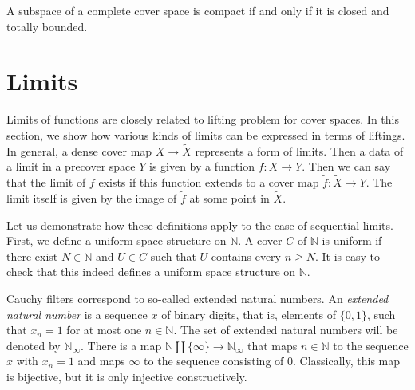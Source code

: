 \documentclass[reqno]{amsart}
\theoremstyle{definition}
\theoremstyle{remark}
\numberwithin{figure}{section}
\begin{document}
\begin{cor}
A subspace of a complete cover space is compact if and only if it is closed and totally bounded.
\end{cor}

\section{Limits}
\label{sec:limits}

Limits of functions are closely related to lifting problem for cover spaces.
In this section, we show how various kinds of limits can be expressed in terms of liftings.
In general, a dense cover map $X \to \widetilde{X}$ represents a form of limits.
Then a data of a limit in a precover space $Y$ is given by a function $f : X \to Y$.
Then we can say that the limit of $f$ exists if this function extends to a cover map $\widetilde{f} : \widetilde{X} \to Y$.
The limit itself is given by the image of $\widetilde{f}$ at some point in $\widetilde{X}$.

Let us demonstrate how these definitions apply to the case of sequential limits.
First, we define a uniform space structure on $\mathbb{N}$.
A cover $C$ of $\mathbb{N}$ is uniform if there exist $N \in \mathbb{N}$ and $U \in C$ such that $U$ contains every $n \geq N$.
It is easy to check that this indeed defines a uniform space structure on $\mathbb{N}$.

Cauchy filters correspond to so-called extended natural numbers.
An \emph{extended natural number} is a sequence $x$ of binary digits, that is, elements of $\{ 0, 1 \}$, such that $x_n = 1$ for at most one $n \in \mathbb{N}$.
The set of extended natural numbers will be denoted by $\mathbb{N}_\infty$.
There is a map $\mathbb{N} \amalg \{ \infty \} \to \mathbb{N}_\infty$ that maps $n \in \mathbb{N}$ to the sequence $x$ with $x_n = 1$ and maps $\infty$ to the sequence consisting of $0$.
Classically, this map is bijective, but it is only injective constructively.
\end{document}
